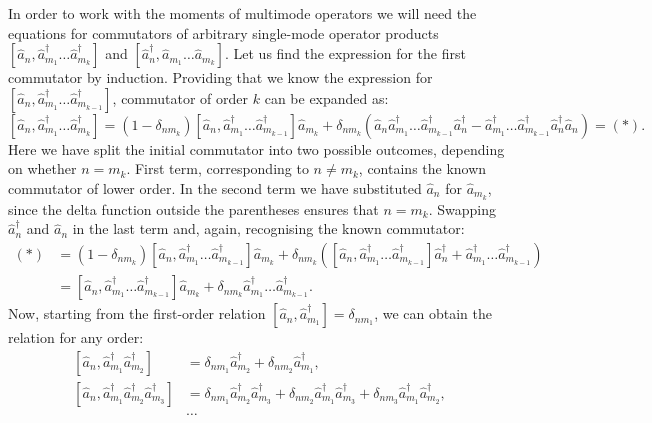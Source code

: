 In order to work with the moments of multimode operators we will need the equations for commutators of arbitrary single-mode operator products $[ \hat{a}_n, \hat{a}_{m_1}^\dagger \ldots \hat{a}_{m_k}^\dagger ]$ and $[ \hat{a}_n^\dagger, \hat{a}_{m_1} \ldots \hat{a}_{m_k} ]$.
Let us find the expression for the first commutator by induction.
Providing that we know the expression for $[ \hat{a}_n, \hat{a}_{m_1}^\dagger \ldots \hat{a}_{m_{k-1}}^\dagger ]$,
commutator of order $k$ can be expanded as:
\[
	[ \hat{a}_n, \hat{a}_{m_1}^\dagger \ldots \hat{a}_{m_k}^\dagger ]
	= (1 - \delta_{n m_k})
		[ \hat{a}_n, \hat{a}_{m_1}^\dagger \ldots \hat{a}_{m_{k-1}}^\dagger ] \hat{a}_{m_k}
	+ \delta_{n m_k} (
		\hat{a}_n \hat{a}_{m_1}^\dagger \ldots \hat{a}_{m_{k-1}}^\dagger \hat{a}_n^\dagger
		- \hat{a}_{m_1}^\dagger \ldots \hat{a}_{m_{k-1}}^\dagger \hat{a}_n^\dagger \hat{a}_n
	)
	= (*).
\]
Here we have split the initial commutator into two possible outcomes, depending on whether $n = m_k$.
First term, corresponding to $n \ne m_k$, contains the known commutator of lower order.
In the second term we have substituted $\hat{a}_n$ for $\hat{a}_{m_k}$,
since the delta function outside the parentheses ensures that $n = m_k$.
Swapping $\hat{a}_n^\dagger$ and $\hat{a}_n$ in the last term and, again, recognising the known commutator:
\begin{equation*}
\begin{split}
	(*)
	& = (1 - \delta_{n m_k})
		[ \hat{a}_n, \hat{a}_{m_1}^\dagger \ldots \hat{a}_{m_{k-1}}^\dagger ] \hat{a}_{m_k}
	+ \delta_{n m_k} (
		[ \hat{a}_n, \hat{a}_{m_1}^\dagger \ldots \hat{a}_{m_{k-1}}^\dagger ] \hat{a}_n^\dagger
		+ \hat{a}_{m_1}^\dagger \ldots \hat{a}_{m_{k-1}}^\dagger
	) \\
	& = [ \hat{a}_n, \hat{a}_{m_1}^\dagger \ldots \hat{a}_{m_{k-1}}^\dagger ] \hat{a}_{m_k}
	+ \delta_{n m_k} \hat{a}_{m_1}^\dagger \ldots \hat{a}_{m_{k-1}}^\dagger.
\end{split}
\end{equation*}
Now, starting from the first-order relation $[ \hat{a}_n, \hat{a}_{m_1}^\dagger ] = \delta_{n m_1}$, we can obtain the relation for any order:
\begin{equation*}
\begin{split}
	[ \hat{a}_n, \hat{a}_{m_1}^\dagger \hat{a}_{m_2}^\dagger ]
	& = \delta_{n m_1} \hat{a}_{m_2}^\dagger + \delta_{n m_2} \hat{a}_{m_1}^\dagger, \\
	[ \hat{a}_n, \hat{a}_{m_1}^\dagger \hat{a}_{m_2}^\dagger \hat{a}_{m_3}^\dagger ]
	& = \delta_{n m_1} \hat{a}_{m_2}^\dagger \hat{a}_{m_3}^\dagger
	+ \delta_{n m_2} \hat{a}_{m_1}^\dagger \hat{a}_{m_3}^\dagger
	+ \delta_{n m_3} \hat{a}_{m_1}^\dagger \hat{a}_{m_2}^\dagger, \\
	& \ldots
\end{split}
\end{equation*}
